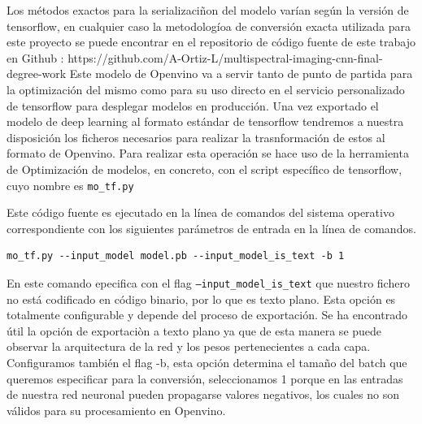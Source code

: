 Los métodos exactos para la serializaciñon del modelo varían según la versión de tensorflow, en cualquier caso la metodologíoa de conversión exacta utilizada
para este proyecto se puede encontrar en el repositorio de código fuente de este trabajo en Github : https://github.com/A-Ortiz-L/multispectral-imaging-cnn-final-degree-work
Este modelo de Openvino va a servir tanto de punto de partida para la optimización del mismo como para su uso directo en el servicio personalizado de tensorflow para desplegar
modelos en producción.
Una vez exportado el modelo de deep learning al formato estándar de tensorflow tendremos a nuestra disposición los ficheros necesarios para realizar la trasnformación de estos al formato de Openvino.
Para realizar esta operación se hace uso de la herramienta de Optimización de modelos, en concreto, con el script específico de tensorflow, cuyo nombre
es \texttt{mo\_tf.py}


Este código fuente es ejecutado en la línea de comandos del sistema operativo correspondiente con los siguientes parámetros de entrada en la línea de comandos.


\begin{lstlisting}[caption=Comando de terminal para convertir un modelo tensorflow a uno de openvino.,
  label=a_label,
  float=t]
    mo_tf.py --input_model model.pb --input_model_is_text -b 1
\end{lstlisting}

En este comando epecifica con el flag \texttt{--input\_model\_is\_text} que nuestro fichero no está codificado en código binario, por lo que es texto plano.
Esta opción es totalmente configurable y depende del proceso de exportación.
Se ha encontrado útil la opción de exportaciòn a texto plano ya que de esta manera
se puede observar la arquitectura de la red y los pesos pertenecientes a cada capa.
Configuramos también el flag -b, esta opción determina el tamaño del batch que queremos especificar para la conversión, seleccionamos 1 porque en las entradas de nuestra red neuronal pueden propagarse valores
negativos, los cuales no son válidos para su procesamiento en Openvino.
